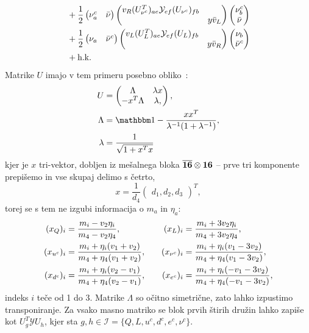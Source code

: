 \begin{align}
	&+ \frac{1}{2} \begin{pmatrix}
		\nu^c_a &\bar{\nu}
	\end{pmatrix} \begin{pmatrix}
		v_R (U^T_{\nu^c})_{ae} \mathcal{Y}_{ef} (U_{\nu^c})_{fb} & \\
		& y \bar{v}_L
	\end{pmatrix} \begin{pmatrix}
		\nu^c_b \\ \bar{\nu}
	\end{pmatrix} \notag \\
	&+ \frac{1}{2}\begin{pmatrix}
		\nu_a & \bar{\nu}^c
	\end{pmatrix} \begin{pmatrix}
		v_L (U^T_L)_{ae} \mathcal{Y}_{ef} (U_L)_{fb} & \\
		& y \bar{v}_R
	\end{pmatrix} \begin{pmatrix}
		\nu_b \\ \bar{\nu}^c
	\end{pmatrix} \notag \\
	&+ \text{h.k.}
\end{align}
Matrike $U$ imajo v tem primeru posebno obliko~\cite{bajc}:
\begin{align}
	U &= \begin{pmatrix}
		\Lambda & \lambda x \\
		-x^T \Lambda & \lambda,
	\end{pmatrix}, \notag \\
	\Lambda &= \one - \frac{x x^T}{\lambda^{-1}(1 + \lambda^{-1})}, \notag \\
	\lambda &= \frac{1}{\sqrt{1 + x^Tx}}
\end{align}
kjer je $x$ tri-vektor, dobljen iz mešalnega bloka $\overline{\mathbf{16}}\otimes\mathbf{16}$ -- prve tri komponente
prepišemo in vse skupaj delimo s četrto,
\begin{equation}
	x = \frac{1}{d_4}\begin{pmatrix}
		d_1, d_2, d_3
	\end{pmatrix}^T,
\end{equation}
torej se s tem ne izgubi informacija o $m_a$ in $\eta_a$:
\begin{alignat}{3}
	(x_Q)_i &= \frac{m_i - v_2\eta_i}{m_4 - v_2\eta_4}, &\quad (x_L)_i &= \frac{m_i + 3v_2 \eta_i}{m_4
		+ 3v_2 \eta_4}, \notag \\
	(x_{u^c})_i &= \frac{m_i + \eta_i(v_1 + v_2)}{m_4 + \eta_4(v_1 + v_2)}, &\quad (x_{\nu^c})_i &=
		\frac{m_i + \eta_i(v_1 - 3v_2)}{m_4 + \eta_4(v_1 - 3v_2)}, \notag \\
	(x_{d^c})_i &= \frac{m_i + \eta_i(v_2 - v_1)}{m_4 + \eta_4(v_2 - v_1)}, &\quad (x_{e^c})_i &=
		\frac{m_i + \eta_i(-v_1 - 3v_2)}{m_4 + \eta_4(-v_1 - 3v_2)},
	\label{ixi}
\end{alignat}
indeks $i$ teče od 1 do 3. Matrike $\Lambda$ so očitno simetrične, zato lahko izpustimo transponiranje.
Za vsako masno matriko se blok prvih štirih družin lahko zapiše kot $U^T_g \mathcal{Y} U_h$, kjer sta
$g, h \in \mathcal{I} = \{Q, L, u^c, d^c, e^c, \nu^c\}$.

